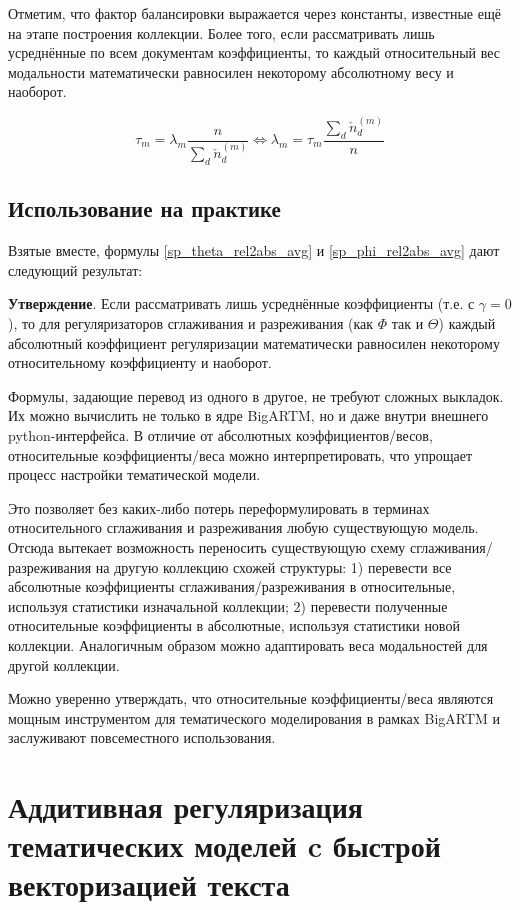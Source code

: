 Отметим, что фактор балансировки выражается через константы, известные ещё на этапе построения коллекции.  Более того, если рассматривать лишь усреднённые по всем документам коэффициенты, то каждый относительный вес модальности математически равносилен некоторому абсолютному весу и наоборот.

\[
\tau_m = \lambda_m \frac{n}{\sum_d \check{n}_d^{(m)}} \iff
\lambda_m = \tau_m \frac{\sum_d \check{n}_d^{(m)}}{n}
\]

\subsection{Использование на практике}

Взятые вместе, формулы \eqref{sp_theta_rel2abs_avg} и \eqref{sp_phi_rel2abs_avg} дают следующий результат:

\textbf{Утверждение}. Если рассматривать лишь усреднённые коэффициенты (т.е. с $\gamma=0$), то для регуляризаторов сглаживания и разреживания (как $\Phi$ так и $\Theta$) каждый абсолютный коэффициент регуляризации математически равносилен некоторому относительному коэффициенту и наоборот.

Формулы, задающие перевод из одного в другое, не требуют сложных выкладок. Их можно вычислить не только в ядре BigARTM, но и даже внутри внешнего python-интерфейса.  В отличие от абсолютных коэффициентов/весов,  относительные коэффициенты/веса можно интерпретировать, что упрощает процесс настройки тематической модели.

Это позволяет без каких-либо потерь переформулировать в терминах относительного сглаживания и разреживания любую существующую модель. Отсюда вытекает возможность переносить существующую схему сглаживания/разреживания на другую коллекцию схожей структуры: 1) перевести все абсолютные коэффициенты сглаживания/разреживания в относительные, используя статистики изначальной коллекции; 2) перевести полученные относительные коэффициенты в абсолютные, используя статистики новой коллекции. Аналогичным образом можно адаптировать веса модальностей для другой коллекции.

Можно уверенно утверждать, что относительные коэффициенты/веса являются мощным инструментом для тематического моделирования в рамках BigARTM и заслуживают повсеместного использования.



\section{Аддитивная регуляризация тематических моделей c быстрой векторизацией текста}

